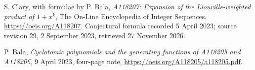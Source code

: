 S. Clary, with formulae by P. Bala,
\emph{A118207: Expansion of the Liouville-weighted product of $1+x^k$},
The On-Line Encyclopedia of Integer Sequences,
\url{https://oeis.org/A118207}.
Conjectural formula recorded 5 April 2023; source revision 29,
2 September 2023, retrieved 27 November 2026.

P. Bala,
\emph{Cyclotomic polynomials and the generating functions of A118205 and A118206},
9 April 2023, four-page note,
\url{https://oeis.org/A118205/a118205.pdf}.
